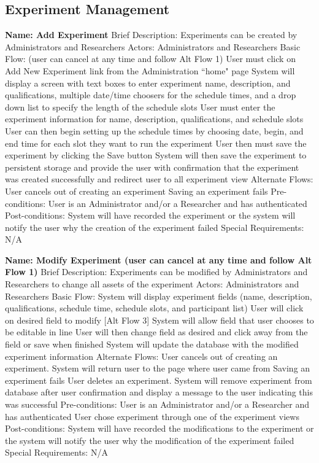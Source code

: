 \begin{outline}[enumerate]
\end{outline}
\subsection{Experiment Management}
\begin{outline}[enumerate]



\1 {\bf Name: Add Experiment}
\2 Brief Description: Experiments can be created by Administrators and Researchers
\2 Actors: Administrators and Researchers
\2 Basic Flow: (user can cancel at any time and follow Alt Flow 1)
\3 User must click on Add New Experiment link from the Administration ``home" page
\3 System will display a screen with text boxes to enter experiment name, description,  and qualifications, multiple date/time choosers for the schedule times, and a drop down list to specify the length of the schedule slots
\3 User must enter the experiment information for name, description, qualifications, and schedule slots
\3 User can then begin setting up the schedule times by choosing date, begin, and end time for each slot they want to run the experiment
\3 User then must save the experiment by clicking the Save button
\3 System will then save the experiment to persistent storage and provide the user with confirmation that the experiment was created successfully and redirect user to all experiment view
\2 Alternate Flows:
\3 User cancels out of creating an experiment
\3 Saving an experiment fails
\2 Pre-conditions:
\3 User is an Administrator and/or a Researcher and has authenticated
\2 Post-conditions:
\3 System will have recorded the experiment or the system will notify the user why the creation of the experiment failed
\2 Special Requirements:
\3 N/A

\1 {\bf Name: Modify Experiment (user can cancel at any time and follow Alt Flow 1)}
\2 Brief Description: Experiments can be modified by Administrators and Researchers to change all assets of the experiment
\2 Actors: Administrators and Researchers
\2 Basic Flow:
\3 System will display experiment fields (name, description, qualifications, schedule time, schedule slots, and participant list)
\3 User will click on desired field to modify [Alt Flow 3]
\3 System will allow field that user chooses to be editable in line
\3 User will then change field as desired and click away from the field or save when finished
\3 System will update the database with the modified experiment information
\2 Alternate Flows:
\3 User cancels out of creating an experiment. System will return user to the page where user came from
\3 Saving an experiment fails
\3 User deletes an experiment. System will remove experiment from database after user confirmation and display a message to the user indicating this was successful
\2 Pre-conditions:
\3 User is an Administrator and/or a Researcher and has authenticated
\3 User chose experiment through one of the experiment views
\2 Post-conditions:
\3 System will have recorded the modifications to the experiment or the system will notify the user why the modification of the experiment failed
\2 Special Requirements:
\3 N/A

\end{outline}
